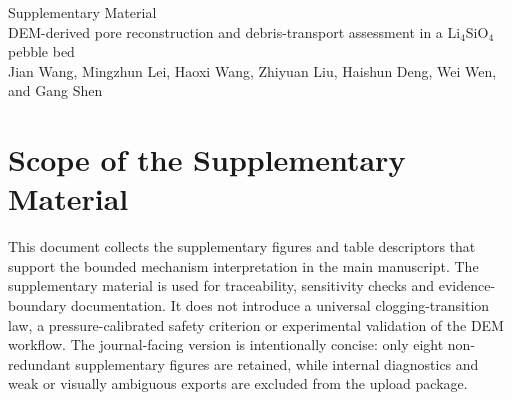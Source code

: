 \documentclass[11pt]{article}
\begin{document}
\begin{center}
{\Large Supplementary Material}\\[0.5em]
{\large DEM-derived pore reconstruction and debris-transport assessment in a Li$_4$SiO$_4$ pebble bed}\\[0.75em]
Jian Wang, Mingzhun Lei, Haoxi Wang, Zhiyuan Liu, Haishun Deng, Wei Wen, and Gang Shen
\end{center}
\section*{Scope of the Supplementary Material}
This document collects the supplementary figures and table descriptors that support the bounded mechanism interpretation in the main manuscript. The supplementary material is used for traceability, sensitivity checks and evidence-boundary documentation. It does not introduce a universal clogging-transition law, a pressure-calibrated safety criterion or experimental validation of the DEM workflow.
The journal-facing version is intentionally concise: only eight non-redundant supplementary figures are retained, while internal diagnostics and weak or visually ambiguous exports are excluded from the upload package.
\end{document}
